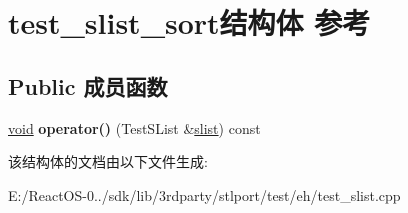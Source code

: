 \hypertarget{structtest__slist__sort}{}\section{test\+\_\+slist\+\_\+sort结构体 参考}
\label{structtest__slist__sort}
\subsection*{Public 成员函数}
\begin{DoxyCompactItemize}
\item 
\mbox{\label{structtest__slist__sort_ab73452e3a2abbe5366dc163a0102906c}} 
\hyperlink{interfacevoid}{void} {\bfseries operator()} (Test\+S\+List \&\hyperlink{classslist}{slist}) const
\end{DoxyCompactItemize}


该结构体的文档由以下文件生成\+:\begin{DoxyCompactItemize}
\item 
E\+:/\+React\+O\+S-\/0../sdk/lib/3rdparty/stlport/test/eh/test\+\_\+slist.\+cpp\end{DoxyCompactItemize}
